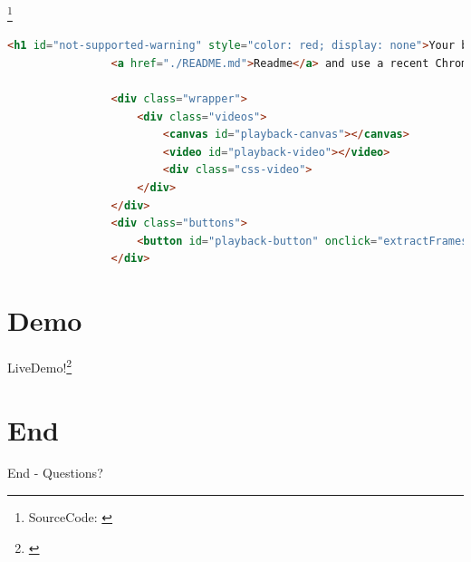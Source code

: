 \documentclass[xcolor=dvipsnames,10pt]{beamer}
\begin{document}
\begin{frame}[fragile]{\secname\footnote{SourceCode: \cite{videoToCss}}}
	\begin{center}
		\begin{minipage}{1\textwidth}
			\begin{lstlisting}[language=HTML, caption=animateKeyFrames()]
				<h1 id="not-supported-warning" style="color: red; display: none">Your browser is not supported! Please refer to the
				<a href="./README.md">Readme</a> and use a recent Chromium based Browser.</h1>

				<div class="wrapper">
					<div class="videos">
						<canvas id="playback-canvas"></canvas>
						<video id="playback-video"></video>
						<div class="css-video">
					</div>
				</div>
				<div class="buttons">
					<button id="playback-button" onclick="extractFrames('$URL',12)">$EXAMPLE_VIDEO</button>
				</div>
			\end{lstlisting}
		\end{minipage}
	\end{center}
\end{frame}

\section{Demo}
\begin{frame}{\secname}
	\center \huge LiveDemo!\footnote{\cite{liveDemo}}
\end{frame}

\section*{End}
\begin{frame}{\secname}
	\center \huge End - Questions?
\end{frame}

\begin{frame}
	\printbibliography
\end{frame}
\end{document}
